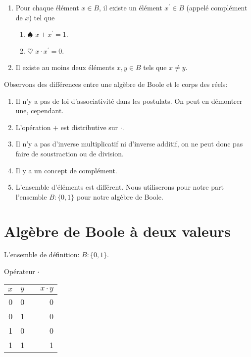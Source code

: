 \documentclass[letter, oneside]{book}
\begin{document}
\begin{enumerate}
\item Pour chaque élément \(x \in B\), il existe un élément
\(x^{\prime} \in B\) (appelé complément de \(x\)) tel que

\begin{enumerate}
\item \(\spadesuit\) \(x + x^{\prime} = 1\).

\item \(\heartsuit\) \(x \cdot x^{\prime} = 0\).
\end{enumerate}

\item Il existe au moins deux éléments \(x, y \in B\) tels que \(x \neq y\).
\end{enumerate}

Observons des différences entre une algèbre de Boole et le corps des réels:

\begin{enumerate}
\item Il n'y a pas de loi d'associativité dans les postulats. On peut en
démontrer une, cependant.

\item L'opération \(+\) est distributive sur \(\cdot\).

\item Il n'y a pas d'inverse multiplicatif ni d'inverse additif, on ne
peut donc pas faire de soustraction ou de division.

\item Il y a un concept de complément.

\item L'ensemble d'éléments est différent. Nous utiliserons pour notre
part l'ensemble \(B: \{0, 1 \}\) pour notre algèbre de Boole.
\end{enumerate}

\section{Algèbre de Boole à deux valeurs}
\label{sec:orgb042988}

L'ensemble de définition: \(B : \{0, 1 \}\).

Opérateur \(\cdot\)

\begin{center}
\begin{tabular}{rrlr}
\(x\) & \(y\) &  & \(x \cdot y\)\\[0pt]
\hline
0 & 0 &  & 0\\[0pt]
0 & 1 &  & 0\\[0pt]
1 & 0 &  & 0\\[0pt]
1 & 1 &  & 1\\[0pt]
\end{tabular}
\end{center}
\end{document}
